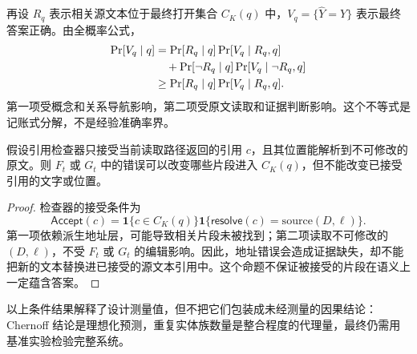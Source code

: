再设 $R_q$ 表示相关源文本位于最终打开集合 $C_K(q)$ 中，$V_q=\{\widehat Y=Y\}$ 表示最终答案正确。由全概率公式，
\begin{align}
\Pr[V_q\mid q]
&=\Pr[R_q\mid q]\Pr[V_q\mid R_q,q]\notag\\
&\quad+\Pr[\neg R_q\mid q]\Pr[V_q\mid\neg R_q,q]\notag\\
&\ge \Pr[R_q\mid q]\Pr[V_q\mid R_q,q].
\label{eq:appendix-answer-bound}
\end{align}
第一项受概念和关系导航影响，第二项受原文读取和证据判断影响。这个不等式是记账式分解，不是经验准确率界。

\begin{proposition}[地址错误的单侧影响]
\label{prop:one-sided}
假设引用检查器只接受当前读取路径返回的引用 $c$，且其位置能解析到不可修改的原文。则 $F_t$ 或 $G_t$ 中的错误可以改变哪些片段进入 $C_K(q)$，但不能改变已接受引用的文字或位置。
\end{proposition}

\begin{proof}
检查器的接受条件为
\[
\mathsf{Accept}(c)=
\mathbf 1\{c\in C_K(q)\}
\mathbf 1\{\mathsf{resolve}(c)=\mathrm{source}(D,\ell)\}.
\]
第一项依赖派生地址层，可能导致相关片段未被找到；第二项读取不可修改的 $(D,\ell)$，不受 $F_t$ 或 $G_t$ 的编辑影响。因此，地址错误会造成证据缺失，却不能把新的文本替换进已接受的源文本引用中。这个命题不保证被接受的片段在语义上一定蕴含答案。
\end{proof}

以上条件结果解释了设计测量值，但不把它们包装成未经测量的因果结论：Chernoff 结论是理想化预测，重复实体族数量是整合程度的代理量，最终仍需用基准实验检验完整系统。






